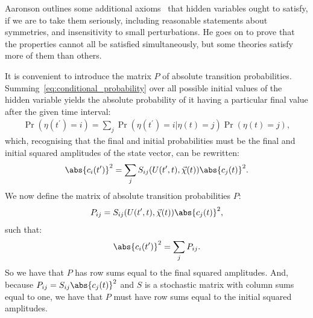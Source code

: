 Aaronson outlines some additional axioms~\cite{PhysRevA.71.032325} that hidden variables ought to satisfy, if we are to take them seriously, including reasonable statements about symmetries, and insensitivity to small perturbations. He goes on to prove that the properties cannot all be satisfied simultaneously, but some theories satisfy more of them than others.

It is convenient to introduce the matrix $P$ of absolute transition probabilities. Summing~\eqref{eq:conditional_probability} over all possible initial values of the hidden variable yields the absolute probability of it having a particular final value after the given time interval:
\begin{align}
\Pr(\eta(t^\prime){=}i) 
= \sum_j \Pr(\eta(t^\prime){=}i|\eta(t){=}j) \Pr(\eta(t){=}j),
\end{align}
which, recognising that the final and initial probabilities must be the final and initial squared amplitudes of the state vector, can be rewritten:
\begin{align}
\abs{c_i(t^\prime)}^2
= \sum_j S_{ij}(U(t^\prime, t), \vec\chi(t)) \abs{c_j(t)}^2.
\end{align}
We now define the matrix of absolute transition probabilities $P$:
\begin{align}\label{eq:P_matrix_def}
P_{ij} = S_{ij}(U(t^\prime, t), \vec\chi(t)) \abs{c_j(t)}^2,
\end{align}
such that:
\begin{align}
\abs{c_i(t^\prime)}^2
= \sum_j P_{ij}.
\end{align}
So we have that $P$ has row sums equal to the final squared amplitudes.
And, because $P_{ij} = S_{ij}\abs{c_j(t)}^2$ and $S$ is a stochastic matrix with column sums equal to one, we have that $P$ must have row sums equal to the initial squared amplitudes.

